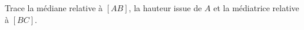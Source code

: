 %
%
Trace la médiane relative à $[AB]$, la hauteur issue de $A$ et la médiatrice relative à $[BC]$.
